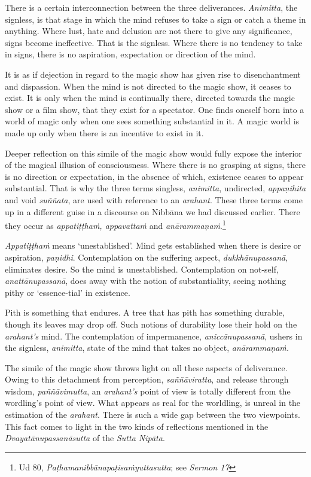 There is a certain interconnection between the three deliverances. \emph{Animitta}, the signless, is that stage in which the mind refuses to take a sign or catch a theme in anything. Where lust, hate and delusion are not there to give any significance, signs become ineffective. That is the signless. Where there is no tendency to take in signs, there is no aspiration, expectation or direction of the mind.

It is as if dejection in regard to the magic show has given rise to disenchantment and dispassion. When the mind is not directed to the magic show, it ceases to exist. It is only when the mind is continually there, directed towards the magic show or a film show, that they exist for a spectator. One finds oneself born into a world of magic only when one sees something substantial in it. A magic world is made up only when there is an incentive to exist in it.

Deeper reflection on this simile of the magic show would fully expose the interior of the magical illusion of consciousness. Where there is no grasping at signs, there is no direction or expectation, in the absence of which, existence ceases to appear substantial. That is why the three terms singless, \emph{animitta}, undirected, \emph{appaṇihita} and void \emph{suññata}, are used with reference to an \emph{arahant}. These three terms come up in a different guise in a discourse on Nibbāna we had discussed earlier. There they occur as \emph{appatiṭṭhaṁ, appavattaṁ} and \emph{anārammaṇaṁ}.\footnote{Ud 80, \emph{Paṭhamanibbānapaṭisaṁyuttasutta}; see \emph{Sermon 17}}

\emph{Appatiṭṭhaṁ} means `unestablished'. Mind gets established when there is desire or aspiration, \emph{paṇidhi}. Contemplation on the suffering aspect, \emph{dukkhānupassanā}, eliminates desire. So the mind is unestablished. Contemplation on not-self, \emph{anattānupassanā}, does away with the notion of substantiality, seeing nothing pithy or `essence-tial' in existence.

Pith is something that endures. A tree that has pith has something durable, though its leaves may drop off. Such notions of durability lose their hold on the \emph{arahant's} mind. The contemplation of impermanence, \emph{aniccānupassanā}, ushers in the signless, \emph{animitta}, state of the mind that takes no object, \emph{anārammaṇaṁ.}

The simile of the magic show throws light on all these aspects of deliverance. Owing to this detachment from perception, \emph{saññāviratta}, and release through wisdom, \emph{paññāvimutta}, an \emph{arahant's} point of view is totally different from the wordling's point of view. What appears as real for the worldling, is unreal in the estimation of the \emph{arahant}. There is such a wide gap between the two viewpoints. This fact comes to light in the two kinds of reflections mentioned in the \emph{Dvayatānupassanāsutta} of the \emph{Sutta Nipāta}.

